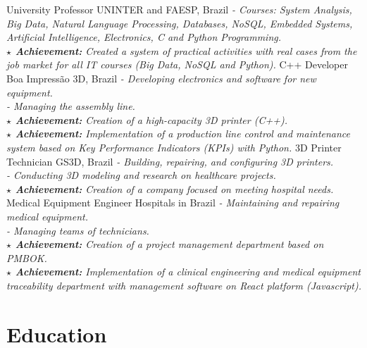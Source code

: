 \documentclass[letterpaper]{twentysecondcv_en} %
\begin{document}
\begin{twenty} %
						{University Professor}
						{UNINTER and FAESP, Brazil}
						{\emph{- Courses: System Analysis, Big Data, Natural Language 
						Processing, Databases, NoSQL, Embedded Systems, Artificial 
						Intelligence, Electronics, C and Python Programming.\\
						\textbf{$\star$ Achievement:} Created a system of practical 
						activities with real cases from the job market for all IT courses
						(Big Data, NoSQL and Python).}}
						{C++ Developer}
						{Boa Impressão 3D, Brazil}
						{\emph{- Developing electronics and software for new equipment.\\
						- Managing the assembly line.\\
						\textbf{$ \star $ Achievement:} Creation of a high-capacity 3D 
						printer (C++).\\
						\textbf{$ \star $ Achievement:} Implementation of a production line 
						control and maintenance system based on Key Performance Indicators 
						(KPIs) with Python.}}
						{3D Printer Technician}
						{GS3D, Brazil}
						{\emph{- Building, repairing, and configuring 3D printers.\\
						- Conducting 3D modeling and research on healthcare projects.\\
						\textbf{$ \star $ Achievement:} Creation of a company focused on 
						meeting hospital needs.}}
						{Medical Equipment Engineer}
						{Hospitals in Brazil}
						{\emph{- Maintaining and repairing medical equipment.\\
						- Managing teams of technicians.\\
						\textbf{$ \star $ Achievement:} Creation of a project management 
						department based on PMBOK.\\
						\textbf{$ \star $ Achievement:} Implementation of a clinical 
						engineering and medical equipment traceability department with 
						management software on React platform (Javascript).}}
\end{twenty}


\section{Education}
\end{document}
